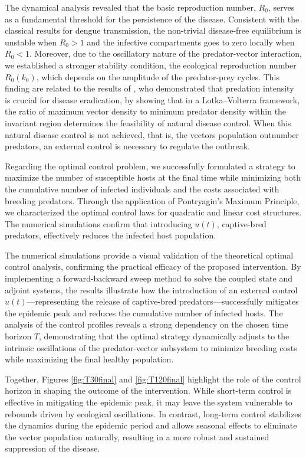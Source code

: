 \documentclass{amsart}
\theoremstyle{definition}
\theoremstyle{remark}
\numberwithin{equation}{section}
\begin{document}
 The dynamical analysis revealed that the basic reproduction number, $R_0$, serves as a fundamental threshold for the persistence of the disease. Consistent with the classical results for dengue transmission, the non-trivial disease-free equilibrium is unstable when $R_0 > 1$ and the infective compartments goes to zero locally when $R_0<1$. Moreover, due to the oscillatory nature of the predator-vector interaction, we established a stronger stability condition, the ecological reproduction number $R_0(k_0)$, which depends on the amplitude of the predator-prey cycles. 
 This finding are related to the results of \cite{Zhou2014}, who demonstrated that predation intensity is crucial for disease eradication, by showing that in a Lotka--Volterra framework, the ratio of maximum vector density to minimum predator density within the invariant region determines the feasibility of natural disease control. When this natural disease control is not achieved, that is, the vectors population outnumber predators, an external control is necessary to regulate the outbreak.
 
 Regarding the optimal control problem, we successfully formulated a strategy to maximize the number of susceptible hosts at the final time while minimizing both the cumulative number of infected individuals and the costs associated with breeding predators. Through the application of Pontryagin’s Maximum Principle, we characterized the optimal control laws for quadratic and linear cost structures. The numerical simulations confirm that introducing $u(t)$, captive-bred predators, effectively reduces the infected host population. 
 
 The numerical simulations provide a visual validation of the theoretical optimal control analysis, confirming the practical efficacy of the proposed intervention. By implementing a forward-backward sweep method to solve the coupled state and adjoint systems, the results illustrate how the introduction of an external control $u(t)$—representing the release of captive-bred predators—successfully mitigates the epidemic peak and reduces the cumulative number of infected hosts. The analysis of the control profiles reveals a strong dependency on the chosen time horizon $T$, demonstrating that the optimal strategy dynamically adjusts to the intrinsic oscillations of the predator-vector subsystem to minimize breeding costs while maximizing the final healthy population. 
 
 Together, Figures \ref{fig:T30final} and \ref{fig:T120final} highlight the role of the control horizon in shaping the outcome of the intervention.
While short-term control is effective in mitigating the epidemic peak, it may leave the system vulnerable to rebounds driven by ecological oscillations.
In contrast, long-term control stabilizes the dynamics during the epidemic period and allows seasonal effects to eliminate the vector population naturally, resulting in a more robust and sustained suppression of the disease.
\end{document}
